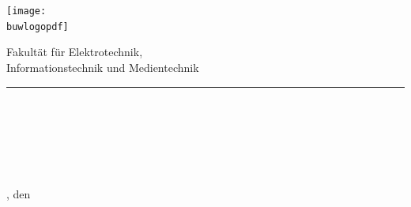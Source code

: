 	\begin{titlepage}
		\sffamily%
		\hspace{-1.5em}%
		\texttt{[image: \\buwlogopdf]}%
		\hfill%
		\begin{minipage}[b]{\linewidth-4.5cm}
			\begin{flushright}
				\normalsize{Fakultät für Elektrotechnik,}%
				\\\vspace{0.2mm}
				\normalsize{Informationstechnik und Medientechnik}%
				\vspace*{0.05mm}
			\end{flushright}
		\end{minipage}
		\vspace{-0.3em}
		\begingroup%
			\color{primary}%
			\rule{\textwidth}{3pt}%
		\endgroup%
		\begin{flushright}
			\lehrstuhl
		\end{flushright}
		
		\vspace{3.2em}
		\begin{center}
			\textbf{\Huge{\artderarbeit}}%
			\vspace{1.4em}
			\\
			\textbf{\large{\thema}}%
		\end{center}
		
		
		\vfill
	
	
		\begin{center}
			\Large
			\autor%
			\\
			{\Large\matrikelnummer}%
			\bigskip\\%
			\studiengang%
			\\
			{\large\schwerpunkt}%
			\vspace{2em}%
			\hspace{0em}\\%
			\normalsize%
			\ort, den \abgabedatum%
		\end{center}
		
		
		\vspace{7.5em}
		
		
		\quad%
		\pbox[t][2em]{\linewidth}{\betreuer}%
		\hfill%
		\quad%
		\pbox[t][2em]{\linewidth}{\prueferA\\\prueferB}%
	
	\end{titlepage}
